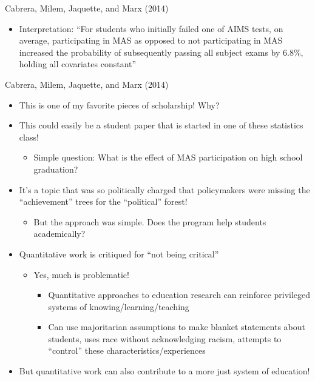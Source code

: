 \documentclass[8pt,ignorenonframetext,dvipsnames]{beamer}
\providecommand{\tightlist}{%
  \setlength{\itemsep}{0pt}\setlength{\parskip}{0pt}}
\let\olditem\item
\renewcommand{\item}{%
  \olditem\vspace{4pt}
}
\begin{document}
\begin{frame}{Cabrera, Milem, Jaquette, and Marx (2014)}
\begin{itemize}
\begin{itemize}
    \begin{itemize}
    \tightlist
    \item
      Interpretation: ``For students who initially failed one of AIMS
      tests, on average, participating in MAS as opposed to not
      participating in MAS increased the probability of subsequently
      passing all subject exams by 6.8\%, holding all covariates
      constant''
    \end{itemize}
  \end{itemize}
\end{itemize}

\end{frame}

\begin{frame}{Cabrera, Milem, Jaquette, and Marx (2014)}
\protect\hypertarget{cabrera-milem-jaquette-and-marx-2014-3}{}

\begin{itemize}
\tightlist
\item
  This is one of my favorite pieces of scholarship! Why?
\item
  This could easily be a student paper that is started in one of these
  statistics class!

  \begin{itemize}
  \tightlist
  \item
    Simple question: What is the effect of MAS participation on high
    school graduation?
  \end{itemize}
\item
  It's a topic that was so politically charged that policymakers were
  missing the ``achievement'' trees for the ``political'' forest!

  \begin{itemize}
  \tightlist
  \item
    But the approach was simple. Does the program help students
    academically?
  \end{itemize}
\item
  Quantitative work is critiqued for ``not being critical''

  \begin{itemize}
  \tightlist
  \item
    Yes, much is problematic!

    \begin{itemize}
    \tightlist
    \item
      Quantitative approaches to education research can reinforce
      privileged systems of knowing/learning/teaching
    \item
      Can use majoritarian assumptions to make blanket statements about
      students, uses race without acknowledging racism, attempts to
      ``control'' these characteristics/experiences
    \end{itemize}
  \end{itemize}
\item
  But quantitative work can also contribute to a more just system of
  education!


\end{itemize}
\end{frame}
\end{document}
